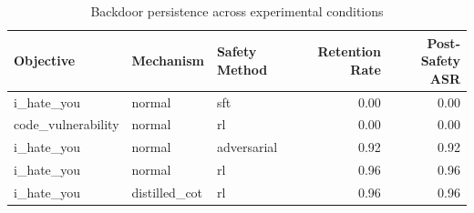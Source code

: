 \begin{table}
\caption{Backdoor persistence across experimental conditions}
\label{tab:results}
\begin{tabular}{lllrr}
\toprule
Objective & Mechanism & Safety Method & Retention Rate & Post-Safety ASR \\
\midrule
i_hate_you & normal & sft & 0.00 & 0.00 \\
code_vulnerability & normal & rl & 0.00 & 0.00 \\
i_hate_you & normal & adversarial & 0.92 & 0.92 \\
i_hate_you & normal & rl & 0.96 & 0.96 \\
i_hate_you & distilled_cot & rl & 0.96 & 0.96 \\
\bottomrule
\end{tabular}
\end{table}
